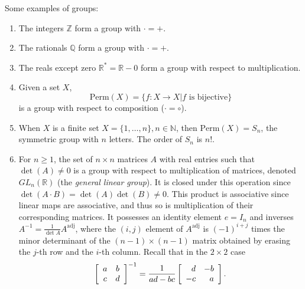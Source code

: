 \begin{xmpl}
  Some examples of groups:
  \begin{enumerate}
    \item{The integers $\mathbb{Z}$ form a group with $\cdot = +$.}
    \item{The rationals $\mathbb{Q}$ form a group with $\cdot = +$.}
    \item{The reals except zero $\mathbb{R}^\ast = \mathbb{R} - {0}$
          form a group with respect to multiplication.}
    \item{Given a set $X$,
          $$
          \mathrm{Perm}(X) = \{f : X \to X | f \text{ is bijective}\}
          $$
          is a group with respect to composition ($\cdot = \circ$).
          }
     \item{When $X$ is a finite set $X = \{1, \dots, n\}, n \in \mathbb{N}$,
           then $\mathrm{Perm}(X) = S_n$, the symmetric group with $n$ letters.
           The order of $S_n$ is $n!$.
          }
     \item{For $n \geq 1$, the set of $n \times n$ matrices $A$
           with real entries such that $\det(A) \neq 0$ is a
           group with respect to multiplication of matrices, denoted
           $GL_n(\mathbb{R})$ (the \emph{general linear group}).
           It is closed under this operation since
           $\det(A \cdot B) = \det(A) \det(B) \neq 0$. This product is
           associative since linear maps are associative, and thus so is
           multiplication of their corresponding matrices. It possesses
           an identity element $e = I_n$ and inverses
           $A^{-1} = \frac{1}{\det A} A^{\mathrm{adj}}$, where
           the $(i, j)$ element of $A^{\mathrm{adj}}$ is $(-1)^{i + j}$ times
           the minor determinant of the $(n-1) \times (n-1)$ matrix obtained
           by erasing the $j$-th row and the $i$-th column.
           Recall that in the $2 \times 2$ case
           $$
           \left[\begin{array}{c c}
             a & b \\ c & d
           \end{array}\right]^{-1}
         = \frac{1}{ad - bc}
           \left[\begin{array}{r r}
             d & -b \\ -c & a
           \end{array}\right].
           $$
           }
  \end{enumerate}
\end{xmpl}


